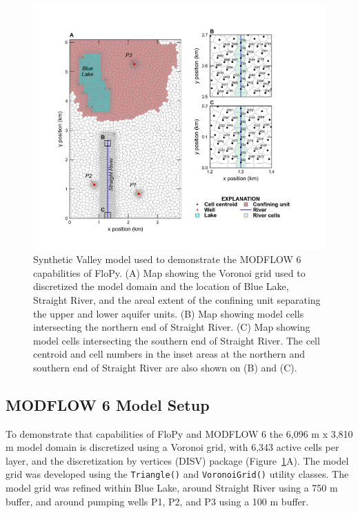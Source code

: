 \documentclass[12pt, oneside]{article}  	%
\begin{document}
\begin{figure}[ht!]
	\begin{center}
		\includegraphics{figures/mv_voronoi_river_discretization.png}
	\end{center}
	\caption{Synthetic Valley model used to demonstrate the MODFLOW 6 capabilities of FloPy. (A) Map showing the Voronoi grid used to discretized the model domain and the location of Blue Lake, Straight River, and the areal extent of the confining unit separating the upper and lower aquifer units. (B) Map showing model cells intersecting the northern end of Straight River. (C) Map showing model cells intersecting the southern end of Straight River. The cell centroid and cell numbers in the inset areas at the northern and southern end of Straight River are also shown on (B) and (C).}
	\label{fig:mvgrid}
\end{figure}

\subsection*{MODFLOW 6 Model Setup}

To demonstrate that capabilities of FloPy and MODFLOW 6 the 6,096 m x 3,810 m model domain is discretized using a Voronoi grid, with 6,343 active cells per layer, and the discretization by vertices (DISV) package (Figure~\ref{fig:mvgrid}A). The model grid was developed using the \texttt{Triangle()} and \texttt{VoronoiGrid()} utility classes. The model grid was refined within Blue Lake, around Straight River using a 750 m buffer, and around pumping wells P1, P2, and P3 using a 100 m buffer.
\end{document}
